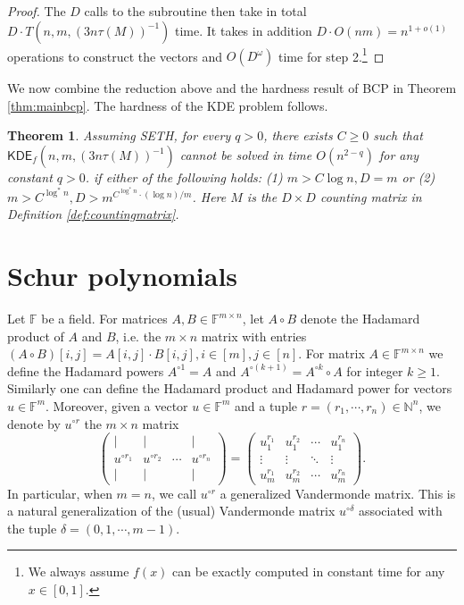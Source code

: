 \documentclass[10pt,a4paper]{article}
\newtheorem{theorem}{Theorem}
\theoremstyle{remark}
\numberwithin{equation}{section}
\numberwithin{theorem}{section}
\newcommand{\N}{\ensuremath{\mathbb{N}}}
\newcommand{\F}{\ensuremath{\mathbb{F}}}
\newcommand{\KDE}{\mathsf{KDE}}
\begin{document}
\begin{proof}
The $D$ calls to the subroutine then take in total $D \cdot T(n, m, (3n\tau(M))^{-1})$ time. It takes in addition $D \cdot O(nm) = n^{1 + o(1)}$ operations to construct the vectors and $O(D^{\omega})$ time for step 2.\footnote{We always assume $f(x)$ can be exactly computed in constant time for any $x \in [0, 1]$.}
\end{proof}

We now combine the reduction above and the hardness result of BCP in Theorem \ref{thm:mainbcp}. The hardness of the KDE problem follows.
\begin{theorem} \label{thm:kdehardness}
Assuming SETH, for every $q > 0$, there exists $C \ge 0$ such that $\KDE_f(n, m, (3n\tau(M))^{-1})$
cannot be solved in time $O(n^{2-q})$ for any constant $q>0$. if either of the following holds: (1) $m > C \log n, D = m$ or (2) $m > C^{\log^* n}, D > m^{C^{\log^* n} \cdot (\log n)/m}$. Here $M$ is the $D \times D$ counting matrix in Definition \ref{def:countingmatrix}.
\end{theorem}

\section{Schur polynomials}
\label{sec:Schur}

Let $\F$ be a field. For matrices $A, B \in \F^{m \times n}$, let $A \circ B$ denote the Hadamard product of $A$ and $B$, i.e. the $m \times n$ matrix with entries $(A \circ B)[i, j] = A[i, j] \cdot B[i, j], i\in [m], j \in [n]$. For matrix $A \in \F^{m \times n}$ we define the Hadamard powers $A^{\circ 1} = A$ and $A^{\circ (k+1)} = A^{\circ k} \circ A$ for integer $k \ge 1$.
Similarly one can define the Hadamard product and Hadamard power for vectors $u \in \F^m$. Moreover, given a vector $u \in \F^m$ and a tuple $r = (r_1, \cdots, r_n) \in \N^{n}$,
we denote by $u^{\circ r}$ the $m \times n$ matrix
\[\begin{pmatrix}
| & | & & | \\
u^{\circ r_1} & u^{\circ r_2} & \cdots & u^{\circ r_n} \\
| & | & & |
\end{pmatrix}
=\begin{pmatrix}
u_1^{r_1} & u_1^{r_2} & \cdots & u_1^{r_n} \\
\vdots & \vdots & \ddots & \vdots \\
u_m^{r_1} & u_m^{r_2} & \cdots & u_m^{r_n}
\end{pmatrix}.\]
In particular, when $m = n$, we call $u^{\circ r}$ a generalized Vandermonde matrix. This is a natural generalization of the (usual) Vandermonde matrix $u^{\circ \delta}$ associated with the tuple $\delta = (0, 1, \cdots, m-1)$.
\end{document}
